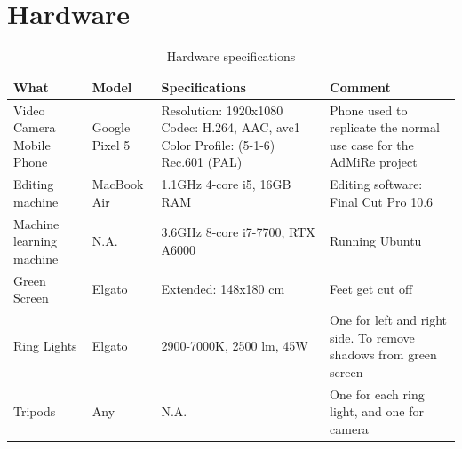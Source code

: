 \section{Hardware}\label{sec:hardware}
\begin{table}[H]
    \centering
    \begin{tabular}{||p{2cm}|p{2cm}|p{4cm}| p{3cm}||} 
         \hline
         \textbf{What} & \textbf{Model} & \textbf{Specifications} & \textbf{Comment} \\ [0.5ex] 
         \hline\hline
         Video Camera Mobile Phone & Google Pixel 5 & Resolution: 1920x1080 \newline Codec: H.264, AAC, avc1 \newline Color Profile: (5-1-6) \newline Rec.601 (PAL) & Phone used to replicate the normal use case for the AdMiRe project \\
         \hline
         Editing machine & MacBook Air & 1.1GHz 4-core i5, 16GB RAM & Editing software: Final Cut Pro 10.6 \\
         \hline
         Machine learning machine & N.A. & 3.6GHz 8-core i7-7700, RTX A6000 & Running Ubuntu \\
         \hline
         Green Screen & Elgato & Extended: 148x180 cm & Feet get cut off \\
         \hline
         Ring Lights & Elgato & 2900-7000K, 2500 lm, 45W & One for left and right side. To remove shadows from green screen \\
         \hline
         Tripods & Any & N.A. & One for each ring light, and one for camera \\ [1ex] 
         \hline
    \end{tabular}
    \caption{Hardware specifications}
    \label{tab:harware}
\end{table}